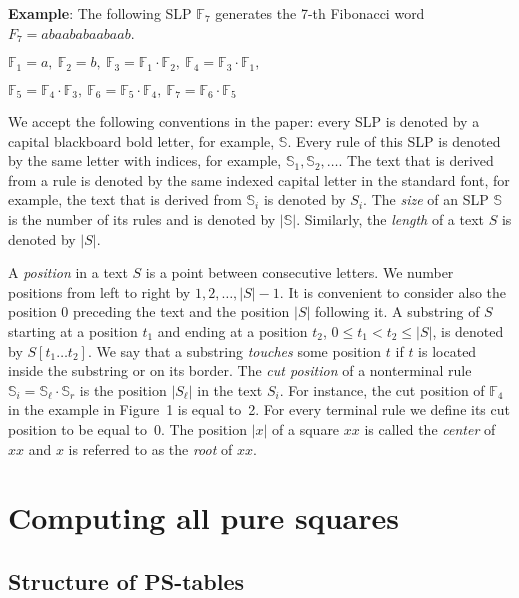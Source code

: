 \documentclass[11pt]{article}
\begin{document}
{\bf Example}: The following SLP $\mathbb{F}_7$ generates the 7-th Fibonacci word $F_7 = abaababaabaab$.
\begin{center}
$\mathbb{F}_1 = a,\ \mathbb{F}_2 = b,\ \mathbb{F}_3 = \mathbb{F}_1\cdot \mathbb{F}_2,\ \mathbb{F}_4 =
\mathbb{F}_3\cdot \mathbb{F}_1,$

$\mathbb{F}_5 = \mathbb{F}_4\cdot \mathbb{F}_3,\ \mathbb{F}_6 = \mathbb{F}_5\cdot \mathbb{F}_4,\ \mathbb{F}_7 =
\mathbb{F}_6\cdot \mathbb{F}_5$
\end{center}

We accept the following conventions in the paper: every SLP is
denoted by a capital blackboard bold letter, for example,
$\mathbb{S}$. Every rule of this SLP is denoted by the same letter
with indices, for example, $\mathbb{S}_1,\mathbb{S}_2,\dots$. The
text that is derived from a rule is denoted by the same indexed
capital letter in the standard font, for example, the text that is
derived from $\mathbb{S}_i$ is denoted by $S_i$. The \emph{size}
of an SLP $\mathbb{S}$ is the number of its rules and is denoted
by $|\mathbb{S}|$. Similarly, the \emph{length} of a text $S$ is
denoted by $|S|$.

\begin{figure}[t]
\FibonacciWordSLP{}
\end{figure}

A \emph{position} in a text $S$ is a point between consecutive
letters. We number positions from left to right by
$1,2,\dots,|S|-1$. It is convenient to consider also the position
0 preceding the text and the position $|S|$ following it. A
substring of $S$ starting at a position $t_1$ and ending at a
position $t_2$, $0\leq t_1 < t_2 \leq |S|$, is denoted by
$S[t_1\dots t_2]$. We say that a substring \emph{touches} some
position $t$ if $t$ is located inside the substring or on its
border. The \emph{cut position} of a nonterminal rule
$\mathbb{S}_i = \mathbb{S}_\ell\cdot \mathbb{S}_r$ is the position
$|S_\ell|$ in the text $S_i$. For instance, the cut position of
$\mathbb{F}_4$ in the example in Figure~1 is equal to~2. For every
terminal rule we define its cut position to be equal to~0. The
position $|x|$ of a square $xx$ is called the \emph{center} of
$xx$ and $x$ is referred to as the \emph{root} of $xx$.

\section{Computing all pure squares}

\subsection{Structure of PS-tables}
\end{document}
